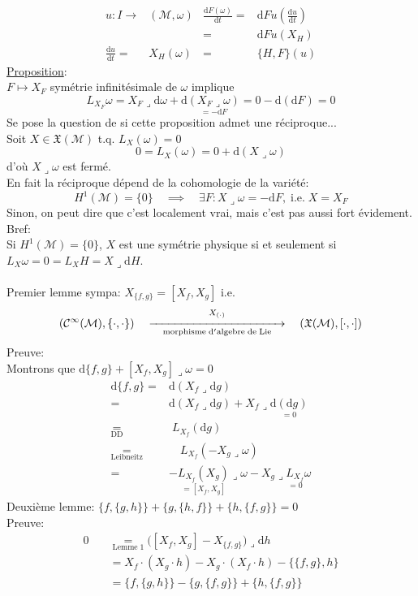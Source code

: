 \documentclass[a4paper,11pt]{article}
\renewcommand{\d}{{\mathrm{d}}}
\begin{document}
\begin{align*}
u : I \to& (\mathcal{M},\omega) &\frac{\d F(\omega)}{\d t} =& \d F u\left(\frac{\d u}{\d t}\right)\\
&&=& \d F u(X_H)\\
\frac{\d u}{\d t} =& X_H(\omega)
& =& \{H,F\}(u)
\end{align*}
\underline{Proposition}:\\
$F\mapsto X_F$ symétrie infinitésimale de $\omega$ implique
$$L_{X_F}\omega = X_F \lrcorner\d \omega + \d \underset{=-\d F}{\left(X_F\lrcorner \omega\right)}=0 - \d(\d F) = 0$$
Se pose la question de si cette proposition admet une réciproque...\\
Soit $X\in \mathfrak{X}(\mathcal{M})$ t.q. $L_X(\omega)=0$
$$0=L_X(\omega)=0+\d (X\lrcorner\omega)$$
d'où $X\lrcorner\omega$ est fermé.\\
En fait la réciproque dépend de la cohomologie de la variété:
$$H^1(\mathcal{M})=\{0\} \quad \implies \quad \exists F : X\lrcorner\omega = - \d F, \; \mathrm{i}.\mathrm{e}. \; X=X_F$$
Sinon, on peut dire que c'est localement vrai, mais c'est pas aussi fort évidement. Bref:\\
Si $H^1(\mathcal{M})=\{0\}$, $X$ est une symétrie physique si et seulement si $L_X\omega = 0 = L_XH=X\lrcorner\d H$.\\
\\
Premier lemme sympa: $X_{\{f,g\}}=[X_f,X_g]$ i.e.
$$\left(\mathcal{C}^\infty(\mathcal{M}), \{\cdot,\cdot\}\right) \quad \overset{X_{(\cdot)}}{\underset{\mathrm{morphisme}\;\d '\mathrm{algebre}\;\mathrm{de}\;\mathrm{Lie}}{\xrightarrow{\hspace*{4cm}}}} \quad \left(\mathfrak{X}(\mathcal{M}),[\cdot,\cdot]\right)$$
Preuve:\\
Montrons que $\d \{f,g\} + [X_f,X_g]\lrcorner\omega = 0$
\begin{align*}
\d \{f,g\} =& \d \left(X_f \lrcorner\d g\right)\\
=& \d \left(X_f\lrcorner\d g\right)+ X_f \lrcorner\underset{=0}{\d(\d g)}\\
\underset{\mathrm{DD}}=\!\!&\;L_{X_f}(\d g)\\
\underset{\mathrm{Leibneitz}}=\!\!\!\!\!\!\!\!&\quad L_{X_f}(-X_g\lrcorner\omega)\\
=&-\underset{=[X_f,X_g]}{L_{X_f}(X_g)}\lrcorner\omega-X_g\lrcorner \underset{=0}{L_{X_f}}\omega
\end{align*}
Deuxième lemme: $\{f,\{g,h\}\}+\{g,\{h,f\}\}+\{h,\{f,g\}\}=0$\\
Preuve:
\begin{align*}
0\quad&\!\!\!\!\!\!\!\underset{\mathrm{Lemme}\;1}= \Big([X_f,X_g]-X_{\{f,g\}}\Big)\lrcorner\d h\\
&= X_f \cdot (X_g\cdot h) - X_g \cdot (X_f \cdot h) - \{\{f,g\},h\}\\
&= \{f,\{g,h\}\} - \{g,\{f,g\}\}+\{h,\{f,g\}\} 
\end{align*}
\end{document}
